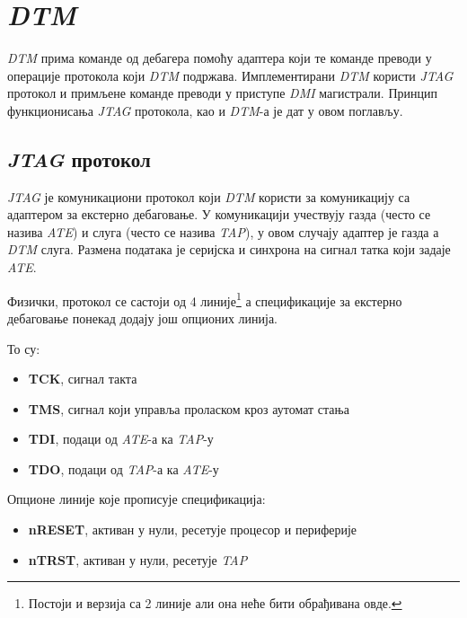 \chapter{\textit{\acrfull{DTM}}}

\textit{\acrshort{DTM}} прима команде од дебагера помоћу адаптера који те команде преводи у операције протокола који \textit{\acrshort{DTM}} подржава. Имплементирани \textit{\acrshort{DTM}} користи \textit{\acrshort{JTAG}} протокол и примљене команде преводи у приступе \textit{\acrshort{DMI}} магистрали. Принцип функционисања \textit{\acrshort{JTAG}} протокола, као и \textit{\acrshort{DTM}}-а је дат у овом поглављу.

\section{\textit{\acrshort{JTAG}} протокол}

\textit{\acrshort{JTAG}} је комуникациони протокол који \textit{\acrshort{DTM}} користи за комуникацију са адаптером за екстерно дебаговање.
У комуникацији учествују газда (често се назива \textit{\acrfull{ATE}}) и слуга (често се назива \textit{\acrfull{TAP}}), у овом случају адаптер је газда а \textit{\acrshort{DTM}} слуга.
Размена података је серијска и синхрона на сигнал татка који задаје \textit{\acrshort{ATE}}.

Физички, протокол се састоји од 4 линије\footnote{Постоји и верзија са 2 линије али она неће бити обрађивана овде.} а спецификације за екстерно дебаговање понекад додају још опционих линија.

То су:
\begin{itemize}
	\item \textbf{\acrfull{TCK}}, сигнал такта
	\item \textbf{\acrfull{TMS}}, сигнал који управља проласком кроз аутомат стања
	\item \textbf{\acrfull{TDI}}, подаци од \textit{\acrshort{ATE}}-а ка \textit{\acrshort{TAP}}-у
	\item \textbf{\acrfull{TDO}}, подаци од \textit{\acrshort{TAP}}-а ка \textit{\acrshort{ATE}}-у
\end{itemize}
Опционе линије које прописује спецификација:
\begin{itemize}
	\item \textbf{nRESET}, активан у нули, ресетује процесор и периферије
	\item \textbf{n\acrshort{TRST}}, активан у нули, ресетује \textit{\acrshort{TAP}}
\end{itemize}

